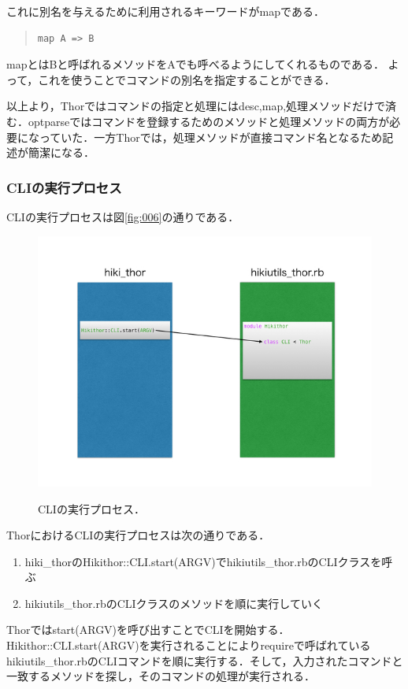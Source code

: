 これに別名を与えるために利用されるキーワードがmapである．
\begin{quote}\begin{verbatim}
map A => B
\end{verbatim}\end{quote}
mapとはBと呼ばれるメソッドをAでも呼べるようにしてくれるものである．
よって，これを使うことでコマンドの別名を指定することができる．

以上より，Thorではコマンドの指定と処理にはdesc,map,処理メソッドだけで済む．optparseではコマンドを登録するためのメソッドと処理メソッドの両方が必要になっていた．一方Thorでは，処理メソッドが直接コマンド名となるため記述が簡潔になる．

\subsubsection{CLIの実行プロセス}
CLIの実行プロセスは図\ref{fig:006}の通りである．

\begin{figure}[htbp]\begin{center}
\includegraphics[width=12cm,bb= 0 0 937 753]{../figs/./hikiutils_yamane.006.jpg}
\caption{CLIの実行プロセス．}
\label{fig:006}
\label{default}\end{center}\end{figure}
ThorにおけるCLIの実行プロセスは次の通りである．

\begin{enumerate}
\item hiki\_thorのHikithor::CLI.start(ARGV)でhikiutils\_thor.rbのCLIクラスを呼ぶ
\item hikiutils\_thor.rbのCLIクラスのメソッドを順に実行していく
\end{enumerate}
Thorではstart(ARGV)を呼び出すことでCLIを開始する．Hikithor::CLI.start(ARGV)を実行されることによりrequireで呼ばれているhikiutils\_thor.rbのCLIコマンドを順に実行する．そして，入力されたコマンドと一致するメソッドを探し，そのコマンドの処理が実行される．

